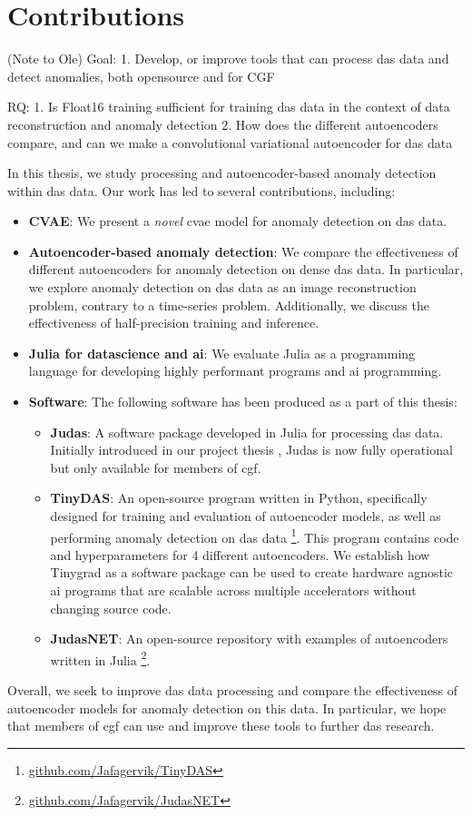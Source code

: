 \section{Contributions}

(Note to Ole)
Goal: 
    1. Develop, or improve tools that can process \acrshort{das} data and detect anomalies, both opensource and for CGF
    
RQ:
    1. Is Float16 training sufficient for training \acrshort{das} data in the context of data reconstruction and anomaly detection
    2. How does the different autoencoders compare, and can we make a convolutional variational autoencoder for das data

In this thesis, we study processing and autoencoder-based anomaly detection within \acrshort{das} data. Our work has led to several contributions, including:

\begin{itemize}
    \item \textbf{CVAE}: We present a \textit{novel} \acrfull{cvae} model for anomaly detection on \acrshort{das} data.
    \item \textbf{Autoencoder-based anomaly detection}: We compare the effectiveness of different autoencoders for anomaly detection on dense \acrshort{das} data. In particular, we explore anomaly detection on \acrshort{das} data as an image reconstruction problem, contrary to a time-series problem. Additionally, we discuss the effectiveness of half-precision training and inference.
    \item \textbf{Julia for datascience and \acrshort{ai}}: We evaluate Julia as a programming language for developing highly performant programs and \acrshort{ai} programming.
    \item \textbf{Software}: The following software has been produced as a part of this thesis:
    \begin{itemize}
        \item \textbf{Judas}: A software package developed in Julia for processing \acrshort{das} data. Initially introduced in our project thesis \cite{projthesis}, Judas is now fully operational but only available for members of \acrshort{cgf}. 
        \item \textbf{TinyDAS}: An open-source program written in Python, specifically designed for training and evaluation of autoencoder models, as well as performing anomaly detection on \acrshort{das} data \footnote{\url{github.com/Jafagervik/TinyDAS}}. This program contains code and hyperparameters for 4 different autoencoders.  We establish how Tinygrad \cite{tinygrad} as a software package can be used to create hardware agnostic \acrshort{ai} programs that are scalable across multiple accelerators without changing source code. 
        \item \textbf{JudasNET}: An open-source repository with examples of autoencoders written in Julia \footnote{\url{github.com/Jafagervik/JudasNET}}.
    \end{itemize}
\end{itemize}

Overall, we seek to improve \acrshort{das} data processing and compare the effectiveness of autoencoder models for anomaly detection on this data. In particular, we hope that members of \acrshort{cgf} can use and improve these tools to further \acrshort{das} research.